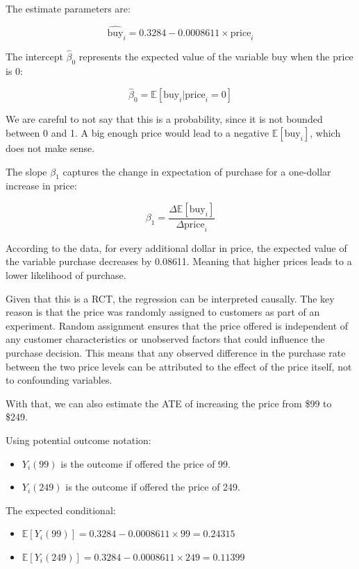 \documentclass{article}
\begin{document}
The estimate parameters are:

$$
\hat{\text{buy}}_i = 0.3284 - 0.0008611 \times \text{price}_i
$$

The intercept $\hat{\beta}_0$ represents the expected value of the variable buy when the price is 0:

$$
\hat{\beta}_0 = \mathbb{E}[\text{buy}_i | \text{price}_i = 0]
$$

We are careful to not say that this is a probability, since it is not bounded between 0 and 1. A big enough price would lead to a negative $\mathbb{E}[\text{buy}_i]$, which does not make sense.

The slope $\beta_1$ captures the change in expectation of purchase for a one-dollar increase in price:

$$
\beta_1 = \dfrac{\Delta \mathbb{E}[\text{buy}_i]}{\Delta \text{price}_i}
$$
    
According to the data, for every additional dollar in price, the expected value of the variable purchase decreases by 0.08611. Meaning that higher prices leads to a lower likelihood of purchase.

Given that this is a RCT, the regression can be interpreted causally. The key reason is that the price was randomly assigned to customers as part of an experiment. Random assignment ensures that the price offered is independent of any customer characteristics or unobserved factors that could influence the purchase decision. This means that any observed difference in the purchase rate between the two price levels can be attributed to the effect of the price itself, not to confounding variables.

With that, we can also estimate the ATE of increasing the price from \$99 to \$249.

Using potential outcome notation:

\begin{itemize}
    \item $Y_i (99)$ is the outcome if offered the price of 99.
    \item $Y_i (249)$ is the outcome if offered the price of 249.
\end{itemize}

The expected conditional:

\begin{itemize}
    \item $\mathbb{E}[Y_i (99)] = 0.3284 - 0.0008611 \times 99 = 0.24315$
    \item $\mathbb{E}[Y_i (249)] = 0.3284 - 0.0008611 \times 249 = 0.11399$ 
\end{itemize}
\end{document}
